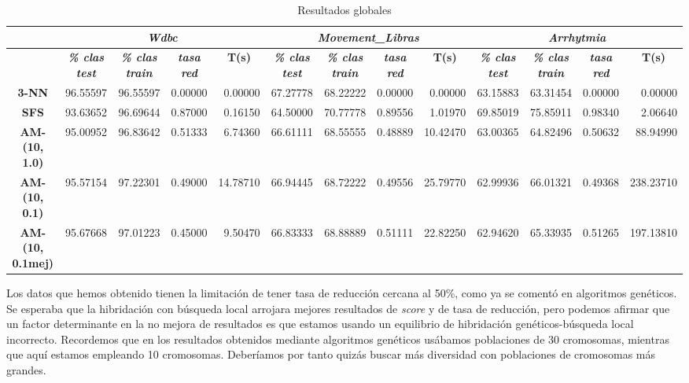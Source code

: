 \documentclass[a4paper,11pt]{article}
\begin{document}
  
  \begin{table}[H]
  \caption{Resultados globales}
  \begin{adjustbox}{width=1.1\textwidth}
  \begin{tabular}{|c|r|r|r|r|r|r|r|r|r|r|r|r|}
  \hline
  \multicolumn{1}{|l|}{} & \multicolumn{ 4}{c|}{\textbf{\textit{Wdbc}}} & \multicolumn{ 4}{c|}{\textbf{\textit{Movement\_Libras}}} & \multicolumn{ 4}{c|}{\textbf{\textit{Arrhytmia}}} \\ \hline
  \multicolumn{1}{|l|}{} & \multicolumn{1}{c|}{\textbf{\textit{\% clas test}}} & \multicolumn{1}{c|}{\textbf{\textit{\% clas train}}} & \multicolumn{1}{c|}{\textbf{\textit{tasa red}}} & \multicolumn{1}{c|}{\textbf{T(s)}} & \multicolumn{1}{c|}{\textbf{\textit{\% clas test}}} & \multicolumn{1}{c|}{\textbf{\textit{\% clas train}}} & \multicolumn{1}{c|}{\textbf{\textit{tasa red}}} & \multicolumn{1}{c|}{\textbf{T(s)}} & \multicolumn{1}{c|}{\textbf{\textit{\% clas test}}} & \multicolumn{1}{c|}{\textbf{\textit{\% clas train}}} & \multicolumn{1}{c|}{\textbf{\textit{tasa red}}} & \multicolumn{1}{c|}{\textbf{T(s)}} \\ \hline
  \textbf{3-NN} & 96.55597 & 96.55597 & 0.00000 & 0.00000 & 67.27778 & 68.22222 & 0.00000 & 0.00000 & 63.15883 & 63.31454 & 0.00000 & 0.00000 \\ \hline
  \textbf{SFS} & 93.63652 & 96.69644 & 0.87000 & 0.16150 & 64.50000 & 70.77778 & 0.89556 & 1.01970 & 69.85019 & 75.85911 & 0.98340 & 2.06640 \\ \hline
  \textbf{AM-(10, 1.0)} & 95.00952 & 96.83642 & 0.51333 & 6.74360 & 66.61111 & 68.55555 & 0.48889 & 10.42470 & 63.00365 & 64.82496 & 0.50632 & 88.94990 \\ \hline
  \textbf{AM-(10, 0.1)} & 95.57154 & 97.22301 & 0.49000 & 14.78710 & 66.94445 & 68.72222 & 0.49556 & 25.79770 & 62.99936 & 66.01321 & 0.49368 & 238.23710 \\ \hline
  \textbf{AM-(10, 0.1mej)} & 95.67668 & 97.01223 & 0.45000 & 9.50470 & 66.83333 & 68.88889 & 0.51111 & 22.82250 & 62.94620 & 65.33935 & 0.51265 & 197.13810 \\ \hline
  \end{tabular}
  \end{adjustbox}
  \label{all}
  \end{table}
  
  Los datos que hemos obtenido tienen la limitación de tener tasa de reducción cercana al 50\%, como ya se comentó en algoritmos
  genéticos. Se esperaba que la hibridación con búsqueda local arrojara mejores resultados de \textit{score} y de tasa de reducción,
  pero podemos afirmar que un factor determinante en la no mejora de resultados es que estamos usando un equilibrio de hibridación
  genéticos-búsqueda local incorrecto. Recordemos que en los resultados obtenidos mediante algoritmos genéticos usábamos 
  poblaciones de 30 cromosomas, mientras que aquí estamos empleando 10 cromosomas. Deberíamos por tanto quizás buscar más
  diversidad con poblaciones de cromosomas más grandes.
\end{document}
